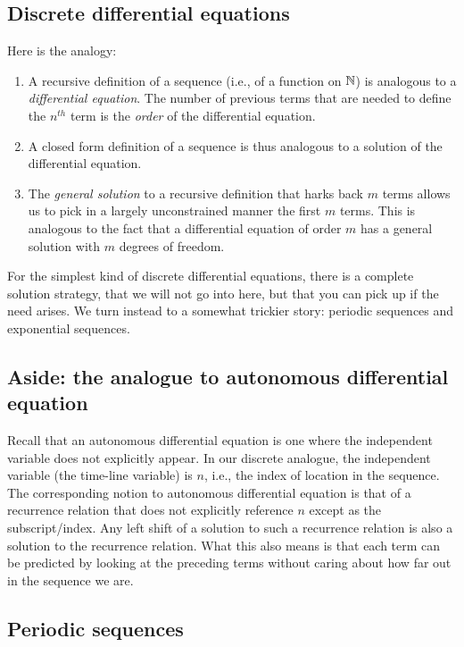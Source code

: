 \documentclass{amsart}
\begin{document}
\subsection{Discrete differential equations}

Here is the analogy:

\begin{enumerate}
\item A recursive definition of a sequence (i.e., of a function on
  $\mathbb{N}$) is analogous to a {\em differential equation}. The number of
  previous terms that are needed to define the $n^{th}$ term is the
  {\em order} of the differential equation.
\item A closed form definition of a sequence is thus analogous to a
  solution of the differential equation.
\item The {\em general solution} to a recursive definition that harks
  back $m$ terms allows us to pick in a largely unconstrained manner
  the first $m$ terms. This is analogous to the fact that a
  differential equation of order $m$ has a general solution with $m$
  degrees of freedom.
\end{enumerate}

For the simplest kind of discrete differential equations, there is a
complete solution strategy, that we will not go into here, but that
you can pick up if the need arises. We turn instead to a somewhat
trickier story: periodic sequences and exponential sequences.

\subsection*{Aside: the analogue to autonomous differential equation}

Recall that an autonomous differential equation is one where the
independent variable does not explicitly appear. In our discrete
analogue, the independent variable (the time-line variable) is $n$,
i.e., the index of location in the sequence. The corresponding notion
to autonomous differential equation is that of a recurrence relation
that does not explicitly reference $n$ except as the
subscript/index. Any left shift of a solution to such a recurrence
relation is also a solution to the recurrence relation. What this also
means is that each term can be predicted by looking at the preceding
terms without caring about how far out in the sequence we are.

\subsection{Periodic sequences}
\end{document}
